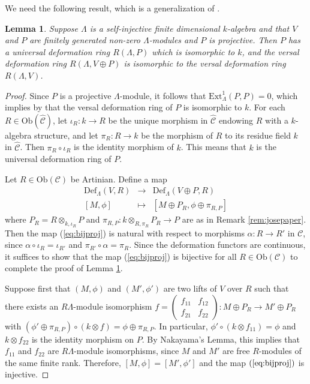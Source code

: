 \documentclass{amsart}
\theoremstyle{plain}
\newtheorem{lemma}[thm]{Lemma}
\theoremstyle{definition}
\theoremstyle{remark}
\begin{document}
We need the following result, which is a generalization of \cite[Thm. 2.6(b)]{blehervelez}.

\begin{lemma}
\label{lem:addproj}
Suppose $\Lambda$ is a self-injective finite dimensional $k$-algebra and that 
$V$ and $P$ are finitely generated non-zero
$\Lambda$-modules and $P$ is projective. Then $P$ has a universal deformation ring $R(\Lambda,P)$
which is isomorphic to $k$, and the versal deformation ring $R(\Lambda,V\oplus P)$ is isomorphic
to the versal deformation ring $R(\Lambda,V)$.
\end{lemma}

\begin{proof}
Since $P$ is a projective $\Lambda$-module, it follows that $\mathrm{Ext}^1_\Lambda(P,P)=0$, which
implies by \cite[Prop. 2.1]{blehervelez} that the versal deformation ring of $P$ is isomorphic to $k$. 
For each $R\in\mathrm{Ob}(\hat{\mathcal{C}})$, let $\iota_R:k\to R$ be the unique morphism in 
$\hat{\mathcal{C}}$ endowing $R$ with a $k$-algebra structure, and let $\pi_R:R\to k$ be the morphism 
of $R$ to its residue field $k$ in $\hat{\mathcal{C}}$. Then $\pi_R\circ \iota_R$ is the identity morphism of $k$. 
This means that $k$ is the universal deformation ring of $P$.

Let $R\in\mathrm{Ob}(\mathcal{C})$ be Artinian. Define a map
\begin{eqnarray}
\label{eq:bijproj}
\mathrm{Def}_\Lambda(V,R)&\to&\mathrm{Def}_\Lambda(V\oplus P, R)\\
{[M,\phi]} &\mapsto&[M\oplus P_R,\phi\oplus \pi_{R,P}]\nonumber
\end{eqnarray}
where $P_R=R\otimes_{k,\iota_R}P$ and $\pi_{R,P}:k\otimes_{R,\pi_R} P_R\to P$ are as in 
Remark \ref{rem:josepaper}. Then the map (\ref{eq:bijproj}) is natural with respect to morphisms
$\alpha:R\to R'$ in $\mathcal{C}$, since $\alpha\circ\iota_R=\iota_{R'}$ and
$\pi_{R'}\circ\alpha=\pi_R$. Since the deformation functors are continuous, it suffices to show that the
map (\ref{eq:bijproj}) is bijective for all $R\in\mathrm{Ob}(\mathcal{C})$ to complete the proof of Lemma \ref{lem:addproj}. 

Suppose first that $(M,\phi)$ and $(M',\phi')$ are two lifts of $V$ over $R$ such that
there exists an $R\Lambda$-module isomorphism 
$f=\left(\begin{array}{cc}f_{11}&f_{12}\\f_{21}&f_{22}\end{array}\right): M\oplus P_R\to M'\oplus P_R$ with
$(\phi'\oplus \pi_{R,P})\circ(k\otimes f) = \phi\oplus \pi_{R,P}$. In particular, $\phi'\circ(k\otimes f_{11})=\phi$
and $k\otimes f_{22}$ is the identity morphism on $P$. By Nakayama's Lemma, this implies that $f_{11}$ and $f_{22}$ 
are $R\Lambda$-module isomorphisms, since $M$ and $M'$ are free $R$-modules of the same finite rank.
Therefore, $[M,\phi]=[M',\phi']$ and the map $(\ref{eq:bijproj})$ is injective.


\end{proof}
\end{document}
